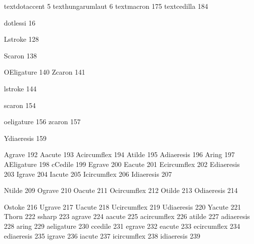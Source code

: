  textdotaccent       5
 texthungarumlaut    6
 textmacron        175 
 textcedilla       184  

 dotlessi           16 %

 Lstroke           128

 Scaron            138

 OEligature        140
 Zcaron            141

 lstroke           144

 scaron            154

 oeligature        156
 zcaron            157

 Ydiaeresis        159

 Agrave            192
 Aacute            193
 Acircumflex       194
 Atilde            195
 Adiaeresis        196      
 Aring             197
 AEligature        198
 cCedile           199
 Egrave            200
 Eacute            201
 Ecircumflex       202
 Ediaeresis        203
 Igrave            204
 Iacute            205
 Icircumflex       206
 Idiaeresis        207

 Ntilde            209
 Ograve            210
 Oacute            211
 Ocircumflex       212
 Otilde            213
 Odiaeresis        214

 Ostoke            216
 Ugrave            217
 Uacute            218
 Ucircumflex       219
 Udiaeresis        220
 Yacute            221
 Thorn             222
 ssharp            223
 agrave            224
 aacute            225
 acircumflex       226
 atilde            227
 adiaeresis        228      
 aring             229
 aeligature        230
 ccedile           231
 egrave            232
 eacute            233
 ecircumflex       234
 ediaeresis        235      
 igrave            236
 iacute            237
 icircumflex       238
 idiaeresis        239

